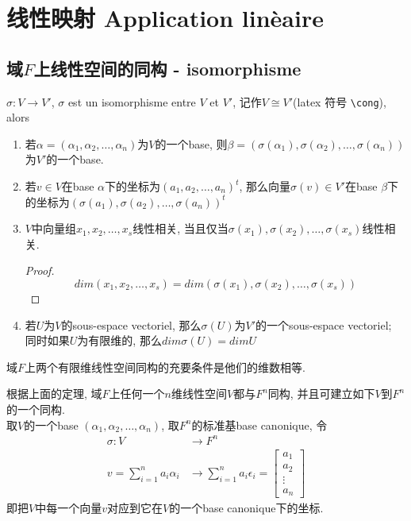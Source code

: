 \documentclass{book}
\begin{document}
\chapter{线性映射 Application lin\`eaire}
\section{域$F$上线性空间的同构 - isomorphisme}
$\sigma: V \rightarrow V'$, $\sigma$ est un isomorphisme entre $V$ et $V'$, 记作$V \cong V'$(latex 符号 \verb+\cong+), alors
\begin{enumerate}
\item 若$\alpha = (\alpha_1, \alpha_2, \ldots, \alpha_n)$为$V$的一个base, 则$\beta = (\sigma(\alpha_1), \sigma(\alpha_2), \ldots, \sigma(\alpha_n))$为$V'$的一个base.
\item 若$v \in V$在base $\alpha$下的坐标为$(a_1, a_2, \ldots, a_n)^t$,
	那么向量$\sigma(v) \in V'$在base $\beta$下的坐标为$(\sigma(a_1), \sigma(a_2), \ldots, \sigma(a_n))^t$
\item $V$中向量组$x_1, x_2, \ldots, x_s$线性相关, 当且仅当$\sigma(x_1), \sigma(x_2), \ldots, \sigma(x_s)$线性相关.
	\begin{proof}
	$$dim(x_1, x_2, \ldots, x_s) = dim(\sigma(x_1), \sigma(x_2), \ldots, \sigma(x_s))$$
	\end{proof}
\item 若$U$为$V$的sous-espace vectoriel, 那么$\sigma(U)$为$V'$的一个sous-espace vectoriel;
		同时如果$U$为有限维的, 那么$dim \sigma(U) = dim U$
\end{enumerate}

\begin{theorem}[维数决定同构]
域$F$上两个有限维线性空间同构的充要条件是他们的维数相等.
\end{theorem}
根据上面的定理, 域$F$上任何一个$n$维线性空间$V$都与$F^n$同构, 并且可建立如下$V$到$F^n$的一个同构.\\
取$V$的一个base $(\alpha_1, \alpha_2, \ldots, \alpha_n)$, 取$F^n$的标准基base canonique, 令
$$
\begin{aligned}
\sigma: V & \rightarrow F^n \\
v = \sum_{i = 1}^n a_i \alpha_i & \rightarrow \sum_{i = 1}^n a_i \epsilon_i = \begin{bmatrix}a_1 \\ a_2 \\ \vdots \\ a_n \end{bmatrix}
\end{aligned}
$$
即把$V$中每一个向量$v$对应到它在$V$的一个base canonique下的坐标.
\end{document}
